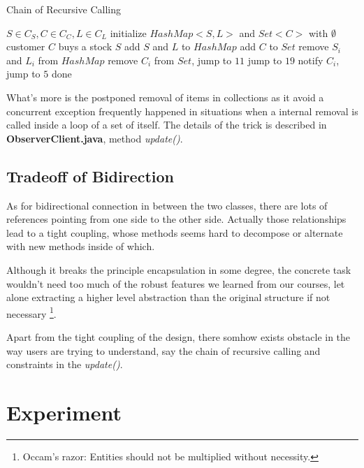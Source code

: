 \documentclass[a4paper]{article}
\begin{document}
\begin{algorithm}\label{algorithm}
\caption{Chain of Recursive Calling}
\begin{algorithmic}[1]
    \REQUIRE $S \in C_{S}, C \in C_{C}, L \in C_{L}$
    \STATE initialize $HashMap<S, L>$ and $Set<C>$ with $\emptyset$
    \STATE customer $C$ buys a stock $S$
    \STATE add $S$ and $L$ to $HashMap$
    \STATE add $C$ to $Set$
        \STATE remove $S_{i}$ and $L_{i}$ from $HashMap$
        \STATE remove $C_{i}$ from $Set$, jump to $11$
        \ENDIF
    \ENDFOR
        \STATE jump to $19$
    \ENDIF
        \STATE notify $C_{i}$, jump to $5$
        \ENDIF
    \ENDFOR
    \STATE done
\end{algorithmic}
\end{algorithm}

What's more is the postponed removal of items in collections as it
avoid a concurrent exception frequently happened in situations when
a internal removal is called inside a loop of a set of itself. The
details of the trick is described in \textbf{ObserverClient.java},
method \textsl{update()}.

\subsection{Tradeoff of Bidirection}%
\label{sub:tradeoff_of_bidirection}

As for bidirectional connection in between the two classes,
there are lots of references pointing from one side to the other side.
Actually those relationships lead to a tight coupling, whose
methods seems hard to decompose or alternate with new methods
inside of which.

Although it breaks the principle encapsulation in some degree,
the concrete task wouldn't need too much of the robust features
we learned from our courses, let alone extracting a higher level abstraction
than the original structure if not necessary
\footnote{Occam's razor: Entities should not be multiplied without necessity.}.

Apart from the tight coupling of the design, there somhow exists
obstacle in the way users are trying to understand, say the
chain of recursive calling and constraints in the \textsl{update()}.

\section{Experiment}%
\label{sec:experiment}
\end{document}
